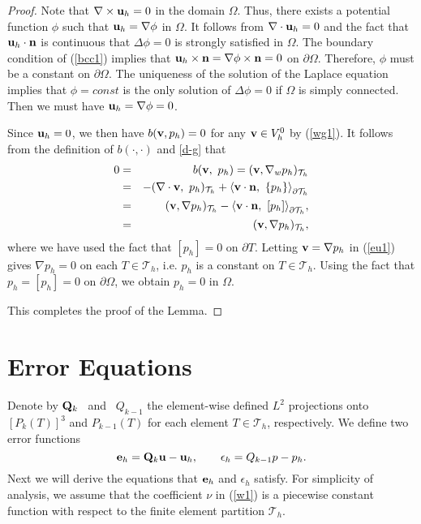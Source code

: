 \documentclass[11pt]{amsart}
\newcommand{\bu}{{\bf u}}
\newcommand{\be}{{\bf e}}
\newcommand{\bv}{{\bf v}}
\newcommand{\bQ}{{\bf Q}}
\def\T{{\mathcal T}}
\def\l{{\langle}}
\def\r{{\rangle}}
\def\bn{{\bf n}}
\begin{document}
\begin{proof}
Note that $\nabla\times \bu_h=0$ in the domain $\Omega$. Thus, there exists a potential
function $\phi$ such that $\bu_h=\nabla\phi$ in $\Omega$. It follows
from $\nabla\cdot \bu_h=0$ and the fact
that $\bu_h\cdot\bn$ is continuous
that $\Delta\phi=0$ is strongly satisfied in $\Omega$. The boundary
condition of (\ref{bcc1}) implies that
$\bu_h\times\bn=\nabla\phi\times\bn=0$ on $\partial\Omega$.
Therefore, $\phi$ must be a constant on $\partial\Omega$. The
uniqueness of the solution of the Laplace equation implies that
$\phi=const$ is the only solution of $\Delta\phi=0$ if $\Omega$ is
simply connected. Then we must have $\bu_h=\nabla\phi=0$.

Since $\bu_h=0$, we then have $b(\bv,p_h)=0$ for any $\bv\in
V_{h}^0$ by (\ref{wg1}). It follows from the definition of $b(\cdot,\cdot)$ and
\eqref{d-g} that
\begin{eqnarray}\label{eu1}
0&=&b(\bv,\ p_h)=(\bv,\nabla_w
p_h)_{\T_h}\\
&=&-(\nabla\cdot\bv,\ p_h)_{\T_h}+\l \bv\cdot\bn,\ \{p_h\}\r_{\partial\T_h}\nonumber\\
&=&(\bv,\nabla p_h)_{\T_h}-\l \bv\cdot\bn,\ [p_h]\r_{\partial\T_h},\nonumber\\
&=&(\bv,\nabla p_h)_{\T_h},\nonumber
\end{eqnarray}
where we have used the fact that $[p_h]=0$ on $\partial T$. Letting
$\bv=\nabla p_h$ in (\ref{eu1}) gives $\nabla p_h=0$ on each $T\in \T_h$, i.e. $p_h$ is a constant on $T\in\T_h$. Using the fact that  $p_h=[p_h]=0$
 on $\partial\Omega$, we obtain $p_h=0$ in $\Omega$. 
 
 This completes the proof of the Lemma.
 
\end{proof}


\section{Error Equations}\label{Section:ErrorEquation}

Denote by $\bQ_k$ \ and \ $Q_{k-1}$ the element-wise defined $L^2$
projections onto $[P_k(T)]^3$ and $P_{k-1}(T)$ for each element $T\in \T_h$, respectively.
We define
two error functions 
$$
\be_h=\bQ_k\bu -\bu_h, \qquad \epsilon_h=Q_{k-1}p-p_h.
$$ 
Next we will derive the equations that $\be_h$ and $\epsilon_h$ satisfy.
For simplicity of analysis, we assume that the coefficient $\nu$ in (\ref{w1}) is a piecewise constant
function with respect to the finite element partition $\T_h$.
\end{document}
